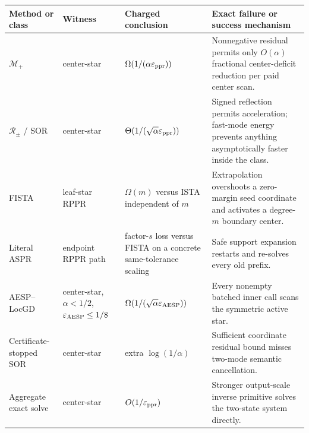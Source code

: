\begin{center}
\begin{tabular}{p{}p{}p{}p{}}
\toprule
Method or class & Witness & Charged conclusion & Exact failure or success
mechanism \\
\midrule
$\mathcal M_+$ & center-star &
$\Omega(1/(\alpha\varepsilon_{\rm ppr}))$ & Nonnegative residual permits only
$O(\alpha)$ fractional center-deficit reduction per paid center scan. \\
$\mathcal R_\pm$ / SOR & center-star &
$\Theta(1/(\sqrt\alpha\varepsilon_{\rm ppr}))$ & Signed reflection permits
acceleration; fast-mode energy prevents anything asymptotically faster inside
the class. \\
FISTA & leaf-star RPPR & $\Omega(m)$ versus ISTA independent of $m$ &
Extrapolation overshoots a zero-margin seed coordinate and activates a
degree-$m$ boundary center. \\
Literal ASPR & endpoint RPPR path & factor-$s$ loss versus FISTA on a concrete
same-tolerance scaling & Safe support expansion restarts and re-solves every
old prefix. \\
AESP--LocGD & center-star, $\alpha<1/2$, $\varepsilon_{\rm AESP}\leq1/8$ &
$\Omega(1/(\sqrt\alpha\varepsilon_{\rm AESP}))$ & Every nonempty batched inner
call scans the symmetric active star. \\
Certificate-stopped SOR & center-star & extra $\log(1/\alpha)$ & Sufficient
coordinate residual bound misses two-mode semantic cancellation. \\
Aggregate exact solve & center-star & $O(1/\varepsilon_{\rm ppr})$ & Stronger
output-scale inverse primitive solves the two-state system directly. \\
\bottomrule
\end{tabular}
\end{center}
